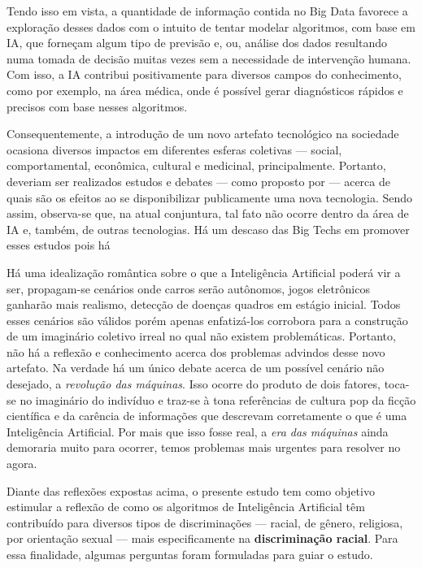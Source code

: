 Tendo isso em vista, a quantidade de informação contida no Big Data favorece a exploração desses dados com o intuito de tentar modelar algoritmos, com base em IA, que forneçam algum tipo de previsão e, ou, análise dos dados resultando numa tomada de decisão muitas vezes sem a necessidade de intervenção humana. Com isso, a IA contribui positivamente para diversos campos do conhecimento, como por exemplo, na área médica, onde é possível gerar diagnósticos rápidos e precisos com base nesses algoritmos.


Consequentemente, a introdução de um novo artefato tecnológico na sociedade ocasiona diversos impactos em diferentes esferas coletivas --- social, comportamental, econômica, cultural e medicinal, principalmente. Portanto, deveriam ser realizados estudos e debates --- como proposto por \citet{simon_jones_doing_2016}  --- acerca de quais são os efeitos ao se disponibilizar publicamente uma nova tecnologia. Sendo assim, observa-se que, na atual conjuntura, tal fato não ocorre dentro da área de IA e, também, de outras tecnologias. Há um descaso das Big Techs em promover esses estudos pois há 

Há uma idealização romântica sobre o que a Inteligência Artificial poderá vir a ser, propagam-se cenários onde carros serão autônomos, jogos eletrônicos ganharão mais realismo, detecção de doenças quadros em estágio inicial. Todos esses cenários são válidos porém apenas enfatizá-los corrobora para a construção de um imaginário coletivo irreal no qual não existem problemáticas. Portanto, não há a reflexão e conhecimento acerca dos problemas advindos desse novo artefato. Na verdade há um único debate acerca de um possível cenário não desejado, a \textit{revolução das máquinas}. Isso ocorre do produto de dois fatores, toca-se no imaginário do indivíduo e traz-se à tona referências de cultura pop da ficção científica  e da carência de informações que descrevam corretamente o que é uma Inteligência Artificial. Por mais que isso fosse real, a \textit{era das máquinas} ainda demoraria muito para ocorrer, temos problemas mais urgentes para resolver no agora.

Diante das reflexões expostas acima, o presente estudo tem como objetivo estimular a reflexão de como os algoritmos de Inteligência Artificial têm contribuído para diversos tipos de discriminações --- racial, de gênero, religiosa, por orientação sexual --- mais especificamente na \textbf{discriminação racial}. Para essa finalidade, algumas perguntas foram formuladas para guiar o estudo.

